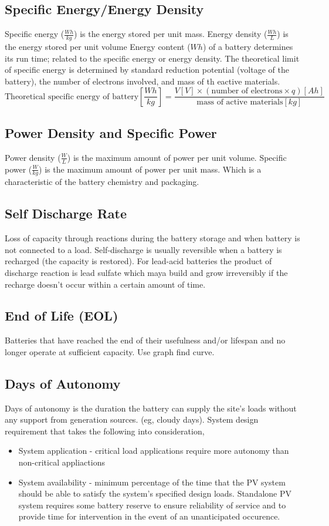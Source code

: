 \documentclass{article}
\begin{document}
\subsection{Specific Energy/Energy Density}
Specific energy ($\frac{Wh}{kg}$) is the energy stored per unit mass.
Energy density ($\frac{Wh}{L}$) is the energy stored per unit volume
Energy content ($Wh$) of a battery determines its run time; related
to the specific energy or energy density.
The theoretical limit of specific energy is determined by standard
reduction potential (voltage of the battery), the number of electrons involved,
and mass of th eactive materials.
\begin{equation}
	\text{Theoretical specific energy of battery}[\frac{Wh}{kg}] = \displaystyle\frac{V[V]\times(\text{number of electrons}\times q)[Ah]}{\text{mass of active materials}[kg]}
\end{equation}
\subsection{Power Density and Specific Power}
Power density ($\frac{W}{L}$) is the maximum amount of power per unit volume.
Specific power ($\frac{W}{kg}$) is the maximum amount of power per unit
mass. Which is a characteristic of the battery chemistry and packaging.
\subsection{Self Discharge Rate}
Loss of capacity through reactions during the battery storage and when battery
is not connected to a load. Self-discharge is usually reversible when a
battery is recharged (the capacity is restored). For lead-acid batteries
the product of discharge reaction is lead sulfate which maya build and grow
irreversibly if the recharge doesn't occur within a certain amount of time.
\subsection{End of Life (EOL)}
Batteries that have reached the end of their usefulness and/or lifespan
and no longer operate at sufficient capacity. Use graph find curve.
\subsection{Days of Autonomy}
Days of autonomy is the duration the battery can supply the site's loads
without any support from generation sources. (eg, cloudy days). System
design requirement that takes the following into consideration,
\begin{itemize}
	\item System application - critical load applications require more autonomy
	      than non-critical appliactions
	\item System availability - minimum percentage of the time that the PV system
	      should be able to satisfy the system's specified design loads. Standalone
	      PV system requires some battery reserve to ensure reliability of service
	      and to provide time for intervention in the event of an unanticipated occurence.
\end{itemize}
\end{document}
